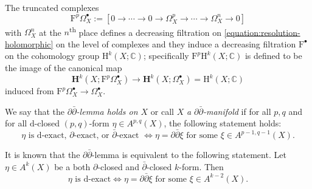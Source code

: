 The truncated complexes 
\begin{equation*}
\mathrm{F}^{p}\Omega_{X}^{\bullet}:= [0\to\cdots \to 0\to \Omega_{X}^{p}
\to\cdots\to\Omega_{X}^{n}\to 0]
\end{equation*}
with \(\Omega_{X}^{n}\) at the \(n\)\textsuperscript{th} place
defines a decreasing filtration 
on \eqref{equation:resolution-holomorphic} 
on the level of complexes and
they induce a decreasing filtration \(\mathrm{F}^{\bullet}\)
on the cohomology group \(\mathrm{H}^{k}(X;\mathbb{C})\);
specifically \(\mathrm{F}^{p}\mathrm{H}^{k}(X;\mathbb{C})\)
is defined to be the image of the canonical map
\begin{equation*}
\mathbf{H}^{k}(X;\mathrm{F}^{p}\Omega_{X}^{\bullet})\to
\mathbf{H}^{k}(X;\Omega_{X}^{\bullet})=\mathrm{H}^{k}(X;\mathbb{C})
\end{equation*}
induced from \(\mathrm{F}^{p}\Omega_{X}^{\bullet}\to \Omega_{X}^{\bullet}\).
\begin{definition}
We say that the
\emph{\(\partial\bar{\partial}\)-lemma holds on \(X\)}
or call \(X\) \emph{a \(\partial\bar{\partial}\)-manifold}
if for all \(p,q\)
and for all \(\mathrm{d}\)-closed \((p,q)\)-form \(\eta\in A^{p,q}(X)\),
the following statement holds:
\begin{equation} 
\tag{\(\ast\)}
\mbox{\(\eta\) is \(\mathrm{d}\)-exact, 
\(\partial\)-exact, or \(\bar{\partial}\)-exact 
\(\Leftrightarrow\)
\(\eta = \partial\bar{\partial}\xi\) for some \(\xi\in A^{p-1,q-1}(X)\)}.
\end{equation}
\end{definition}

\begin{remark}
It is known that the \(\partial\bar{\partial}\)-lemma
is equivalent to the following statement.
Let \(\eta\in A^{k}(X)\) be a both \(\partial\)-closed
and \(\bar{\partial}\)-closed \(k\)-form. Then 
\begin{equation*} 
\mbox{\(\eta\) is \(\mathrm{d}\)-exact
\(\Leftrightarrow\)
\(\eta = \partial\bar{\partial}\xi\) for some \(\xi\in A^{k-2}(X)\)}.
\end{equation*}
\end{remark}

